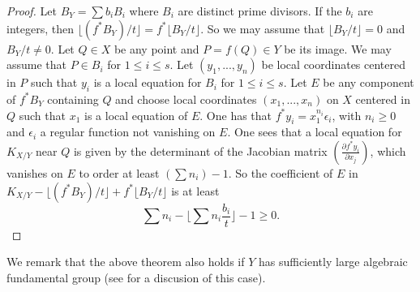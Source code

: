\documentclass[10pt]{amsart}
\begin{document}
\begin{proof}
Let $B_Y=\sum b_iB_i$ where $B_i$ are distinct prime divisors. 
If the $b_i$ are integers, then $\lfloor (f^* B_Y)/t \rfloor =f^*
\lfloor B_Y/t \rfloor$. So we may assume that $\lfloor B_Y/t \rfloor =0$
and $B_Y/t\ne 0$.
Let $Q\in X$ be any point and $P=f(Q)\in Y$ be its image.
We may assume that $P\in B_i$ for $1\leq i\leq s$. Let $(y_1,...,y_n)$ be local
coordinates centered in $P$ such that $y_i$ is a local equation for $B_i$
for $1\leq i\leq s$. Let $E$ be any component of $f^*B_Y$ containing $Q$ and
choose local coordinates $(x_1,...,x_n)$
on $X$ centered in $Q$ such that $x_1$
is a local equation of $E$. One has that $f^*y_i=x_1^{n_i}\epsilon _i$,
with $n_i\geq 0$ and $\epsilon _i$ a regular function not vanishing on $E$.
One sees that a local equation for $K_{X/Y}$ near $Q$ is given by
the determinant of the Jacobian matrix $\left( \frac {\partial f^*y_i}
{\partial x_j} \right)$, which vanishes on $E$ to order at least
$\left( \sum n_i\right) -1$. So the coefficient of $E$ in
$K_{X/Y}-\lfloor (f^*B_Y)/t\rfloor +f^* \lfloor B_Y/t\rfloor$
is at least $$\sum n_i -\lfloor \sum n_i\frac{b_i}{t} \rfloor 
 -1\geq 0.$$
\end{proof}
We remark that the above theorem also holds if $Y$ has sufficiently large 
algebraic fundamental group (see \cite{Hac4} for a discusion of this case).  
\newpage
\end{document}
